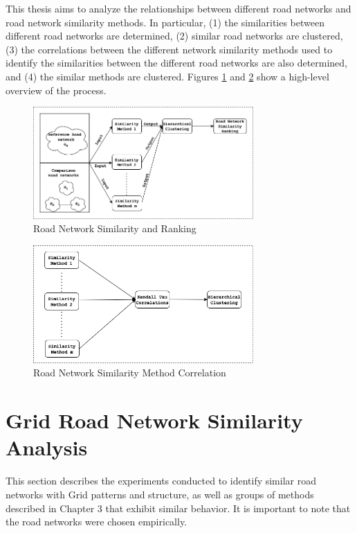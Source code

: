 
This thesis aims to analyze the relationships between different road networks and road network similarity methods. In particular,  (1) the similarities between different road networks are determined, (2) similar road networks are clustered, (3) the correlations between the different network similarity methods used to identify the similarities between the different road networks are also determined, and (4) the similar methods are clustered. Figures \ref{fig:Road Network Similarity and Ranking} and \ref{fig:Road Network Similarity Method Correlation} show a high-level overview of the process. 

\begin{figure}[h]
\centering
\includegraphics[width=0.75\textwidth,center]{picture/network_ranking.png}
\caption[Road Network Similarity and Ranking]{Road Network Similarity and Ranking}
\label{fig:Road Network Similarity and Ranking}
\end{figure}

\begin{figure}[!ht]
\centering
\includegraphics[width=0.75\textwidth,center]{picture/ranking.png}
\caption[Road Network Similarity Method Correlation]{Road Network Similarity Method Correlation}
\label{fig:Road Network Similarity Method Correlation}
\end{figure}


\section{Grid Road Network Similarity Analysis}
\label{4.1}
This section describes the experiments conducted to identify similar road networks with Grid patterns and structure, as well as groups of methods described in Chapter 3 that exhibit similar behavior. It is important to note that the road networks were chosen empirically.

